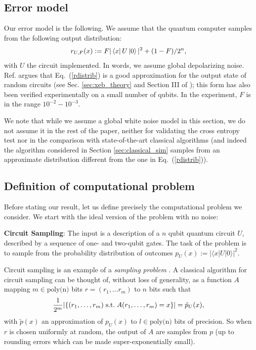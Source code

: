 \subsection{Error model}

Our error model is the following. We assume that the quantum computer samples from the following output distribution:
\begin{equation} \label{rdistrib}
r_{U, F}(x) := F |\mathinner{\langle{x}|}U\mathinner{|{0}\rangle}|^2 + (1 - F)/2^n,
\end{equation}
with $U$ the circuit implemented. In words, we assume global depolarizing noise. Ref. \cite{boixo2018characterizing} argues that Eq.~(\ref{rdistrib}) is a good approximation for the output state of random circuits (see Sec. \ref{sec:xeb_theory} and Section III of \cite{boixo2018characterizing}); this form has also been verified experimentally on a small number of qubits. In the experiment, $F$ is in the range $10^{-2}-10^{-3}$. 

We note that while we assume a global white noise model in this section, we do not assume it in the rest of the paper, neither for validating the cross entropy test nor in the comparison with state-of-the-art classical algorithms (and indeed the algorithm considered in Section \ref{sec:classical_sim} samples from an approximate distribution different from the one in Eq.~(\ref{rdistrib})). 

\subsection{Definition of computational problem}

Before stating our result, let us define precisely the computational problem we consider. We start with the ideal version of the problem with no noise:


\vspace{0.2 cm}

\noindent \textbf{Circuit Sampling}: The input is a description of a $n$ qubit quantum circuit $U$, described by a sequence of one- and two-qubit gates. The task of the problem is to sample from the probability distribution of outcomes $p_U(x) := |\langle x | U | 0 \rangle|^2$. 


\vspace{0.2 cm}

Circuit sampling is an example of a \textit{sampling problem} \cite{aaronson2014equivalence}. A classical algorithm for circuit sampling can be thought of, without loss of generality, as a function $A$ mapping $m \in \text{poly(n)}$ bits $r = (r_1, \ldots r_m)$ to $n$ bits such that
\begin{equation} \label{samplingfunccyion}
\frac{1}{2^m} | \{ (r_1, \ldots, r_m) \hspace{0.1 cm} \text{s.t.}   \hspace{0.1 cm} A(r_1, \ldots, r_m) = x \}  | = \tilde{p}_U(x), 
\end{equation}
with $\tilde{p}(x)$ an approximation of $p_U(x)$ to $l \in \text{poly(n)}$ bits of precision. So when $r$ is chosen uniformly at random, the output of $A$ are samples from $p$ (up to rounding errors which can be made super-exponentially small).

